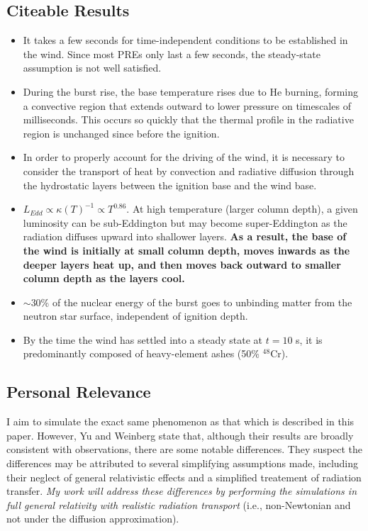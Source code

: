\documentclass[onecolumn]{aastex63}
\begin{document}
\subsection{Citeable Results}
\begin{itemize}
    \item It takes a few seconds for time-independent conditions to be established in the wind. Since most PREs only last a few seconds, the steady-state assumption is not well satisfied.
    \item During the burst rise, the base temperature rises due to He burning, forming a convective region that extends outward to lower pressure on timescales of milliseconds. This occurs so quickly that the thermal profile in the radiative region is unchanged since before the ignition.
    \item In order to properly account for the driving of the wind, it is necessary to consider the transport of heat by convection and radiative diffusion through the hydrostatic layers between the ignition base and the wind base. 
    \item $L_{Edd} \propto \kappa(T)^{-1} \propto T^{0.86}$. At high temperature (larger column depth), a given luminosity can be sub-Eddington but may become super-Eddington as the radiation diffuses upward into shallower layers.\textbf{ As a result, the base of the wind is initially at small column depth, moves inwards as the deeper layers heat up, and then moves back outward to smaller column depth as the layers cool.}
    \item ${\sim}$30\% of the nuclear energy of the burst goes to unbinding matter from the neutron star surface, independent of ignition depth.
    \item By the time the wind has settled into a steady state at $t=10$ s, it is predominantly composed of heavy-element ashes (50\% $^{48}$Cr). 
\end{itemize}


\subsection{Personal Relevance}
I aim to simulate the exact same phenomenon as that which is described in this paper. However, Yu and Weinberg state that, although their results are broadly consistent with observations, there are some notable differences. They suspect the differences may be attributed to several simplifying assumptions made, including their neglect of general relativistic effects and a simplified treatement of radiation transfer. \textit{My work will address these differences by performing the simulations in full general relativity with realistic radiation transport} (i.e., non-Newtonian and not under the diffusion approximation).
\end{document}
